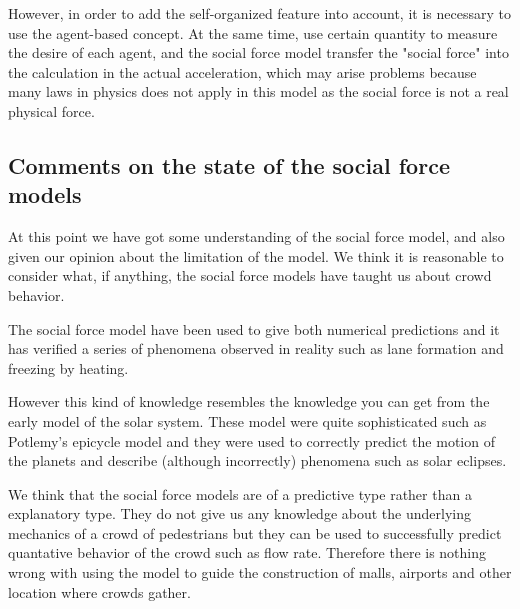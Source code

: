 However, in order to add the self-organized feature into account, it is necessary 
to use the agent-based concept.  At the same time, use certain quantity to measure
the desire of each agent, and the social force model transfer the "social force" into 
the calculation in the actual acceleration, which may arise problems because many laws 
in physics does not apply in this model as the social force is not a real 
physical force.

\subsection{Comments on the state of the social force models}
At this point we have got some understanding of the social force model, and 
also given our opinion about the limitation of the model. We think it is 
reasonable to consider what, if anything, the social force models have taught 
us about crowd behavior. 

The social force model have been used to give both numerical predictions 
and it has verified a series of phenomena observed in reality such as 
lane formation and freezing by heating.

However this kind of knowledge resembles the knowledge you can get from 
the early model of the solar system. These model were quite sophisticated 
such as Potlemy's epicycle model and they were used to correctly predict the 
motion of the planets and describe (although incorrectly) phenomena such as 
solar eclipses.

We think that the social force models are of a predictive type rather than 
a explanatory type. They do not give us any knowledge about the underlying 
mechanics of a crowd of pedestrians but they can be used to successfully 
predict quantative behavior of the crowd such as flow rate. Therefore there 
is nothing wrong with using the model to guide the construction of malls, airports 
and other location where crowds gather.